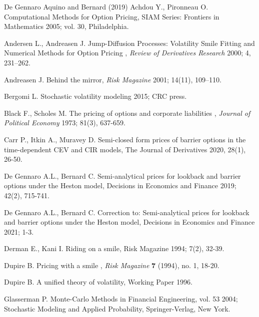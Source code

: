 \documentclass{article}
\begin{document}
\begin{thebibliography}{De Gennaro Aquino and Bernard (2019)}
 Achdou Y., Pironneau O.
Computational Methods for Option Pricing, SIAM Series: Frontiers in
Mathematics 2005; vol. 30, Philadelphia.

 Andersen L., Andreasen
J. Jump-Diffusion Processes: Volatility Smile Fitting and Numerical Methods
for Option Pricing , \textit{Review of Derivatives Research} 2000; 4,
231--262.

 Andreasen J. Behind the mirror, 
\textit{Risk Magazine} 2001; 14(11), 109--110.

 Bergomi L. Stochastic volatility
modeling 2015; CRC press.

 Black F., Scholes M. The
pricing of options and corporate liabilities , \textit{Journal of Political
Economy }1973; 81(3), 637-659.

 Carr P., Itkin A., Muravey
D. Semi-closed form prices of barrier options in the time-dependent CEV and
CIR models, The Journal of Derivatives 2020, 28(1), 26-50.

 De Gennaro A.L.,
Bernard C. Semi-analytical prices for lookback and barrier options under the
Heston model, Decisions in Economics and Finance 2019; 42(2), 715-741.

 De Gennaro A.L.,
Bernard C. Correction to: Semi-analytical prices for lookback and barrier
options under the Heston model, Decisions in Economics and Finance 2021; 1-3.

 Derman E., Kani I. Riding on a
smile, Risk Magazine 1994; 7(2), 32-39.

 Dupire B. Pricing with a smile , \textit{%
Risk Magazine }\textbf{7 }(1994), no. 1, 18-20.

 Dupire B. A unified theory of
volatility, Working Paper 1996.

 Glasserman P. Monte-Carlo
Methods in Financial Engineering, vol. 53 2004; Stochastic Modeling and
Applied Probability, Springer-Verlag, New York.


\end{thebibliography}
\end{document}
